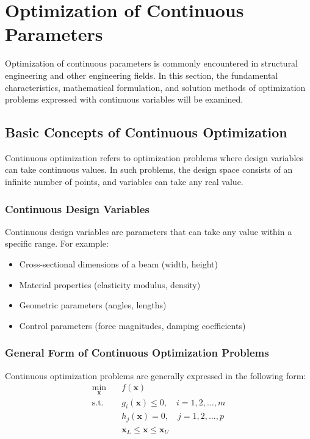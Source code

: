 \section{Optimization of Continuous Parameters}
Optimization of continuous parameters is commonly encountered in structural engineering and other engineering fields. In this section, the fundamental characteristics, mathematical formulation, and solution methods of optimization problems expressed with continuous variables will be examined.

\subsection{Basic Concepts of Continuous Optimization}
Continuous optimization refers to optimization problems where design variables can take continuous values. In such problems, the design space consists of an infinite number of points, and variables can take any real value.

\subsubsection{Continuous Design Variables}
Continuous design variables are parameters that can take any value within a specific range. For example:
\begin{itemize}
    \item Cross-sectional dimensions of a beam (width, height)
    \item Material properties (elasticity modulus, density)
    \item Geometric parameters (angles, lengths)
    \item Control parameters (force magnitudes, damping coefficients)
\end{itemize}

\subsubsection{General Form of Continuous Optimization Problems}
Continuous optimization problems are generally expressed in the following form:
\begin{align}
\min_{\mathbf{x}} \quad & f(\mathbf{x}) \\
\text{s.t.} \quad & g_i(\mathbf{x}) \leq 0, \quad i = 1, 2, \ldots, m \\
& h_j(\mathbf{x}) = 0, \quad j = 1, 2, \ldots, p \\
& \mathbf{x}_L \leq \mathbf{x} \leq \mathbf{x}_U
\end{align}

